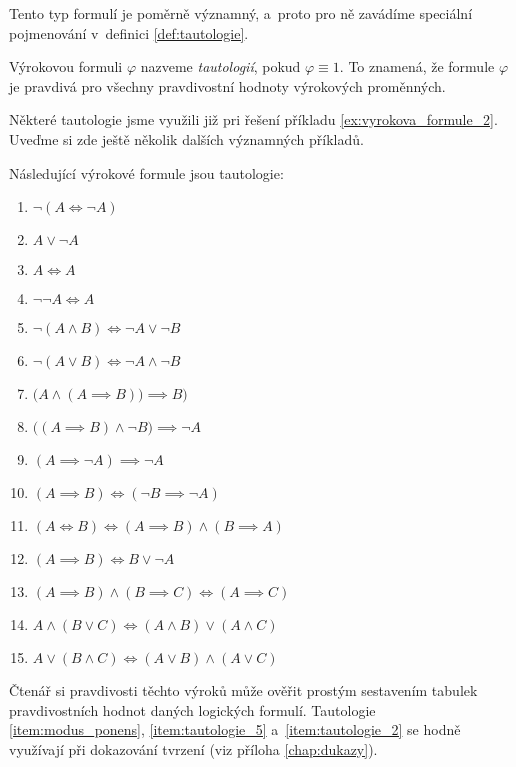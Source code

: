 Tento typ formulí je poměrně významný, a~proto pro ně zavádíme speciální pojmenování v~definici \ref{def:tautologie}.
\begin{definition}[Tautologie]\label{def:tautologie}
    Výrokovou formuli $\varphi$ nazveme \emph{tautologií}, pokud $\varphi\equiv 1$. To znamená, že formule $\varphi$ je pravdivá pro všechny pravdivostní hodnoty výrokových proměnných.
\end{definition}
Některé tautologie jsme využili již pri řešení příkladu \ref{ex:vyrokova_formule_2}. Uveďme si zde ještě několik dalších významných příkladů.
\begin{theorem}\label{thm:vyznamne_tautologie}
    Následující výrokové formule jsou tautologie:
    \begin{enumerate}[label=(\roman*)]
        \item\label{item:tautologie_1} $\neg (A \iff \neg A)$
        \item\label{item:zakon_vylouceneho_tretiho} $A \lor \neg A$ 
        \item\label{item:zakon_identity} $A \iff A$ 
        \item\label{item:zakon_dvoji_negace} $\neg\neg A \iff A$ 
        \item\label{item:de_morgan_1} $\neg (A \land B) \iff \neg A \lor \neg B$ 
        \item\label{item:de_morgan_2} $\neg (A \lor B) \iff \neg A \land \neg B$ 
        \item\label{item:modus_ponens} $\bigl(A \land (A \implies B)\bigr) \implies B)$ 
        \item\label{item:modus_tollens_1} $\bigl((A \implies B) \land \neg B\bigr) \implies \neg A$ 
        \item\label{item:reductio_ad_absurdum} $(A \implies \neg A) \implies \neg A$
        \item\label{item:tautologie_5} $(A \implies B) \iff (\neg B \implies \neg A)$
        \item\label{item:tautologie_2} $(A \iff B) \iff (A \implies B) \land (B \implies A)$
        \item\label{item:tautologie_3} $(A \implies B) \iff B \lor \neg A$
        \item\label{item:tautologie_4} $(A \implies B) \land (B \implies C) \iff (A \implies C)$
        \item\label{item:tautologie_6} $A \land (B \lor C) \iff (A \land B) \lor (A \land C)$
        \item\label{item:tautologie_7} $A \lor (B \land C) \iff (A \lor B) \land (A \lor C)$
    \end{enumerate}
\end{theorem}

Čtenář si pravdivosti těchto výroků může ověřit prostým sestavením tabulek pravdivostních hodnot daných logických formulí. Tautologie \ref{item:modus_ponens}, \ref{item:tautologie_5} a~\ref{item:tautologie_2} se hodně využívají při dokazování tvrzení (viz příloha \ref{chap:dukazy}).